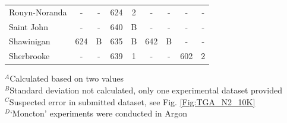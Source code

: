 \documentclass{book}
\begin{document}
\begin{table}[p]
\begin{center}
\begin{tabular}{|l|cc|cc|cc|cc|}
Rouyn-Noranda           & -           & -               & 624            & 2                & -          & -                 & -           & -                     \\
Saint John              & -           & -               & 640            & B                & -          & -                 & -           & -                     \\
Shawinigan              & 624         & B               & 635            & B                & 642        & B                 & -           & -                     \\
Sherbrooke              & -           & -               & 639            & 1                & -          & -                 & 602         & 2                     \\  \hline
\end{tabular}
\end{center}
$^A$Calculated based on two values \\
$^B$Standard deviation not calculated, only one experimental dataset provided \\
$^C$Suspected error in submitted dataset, see Fig. \ref{Fig:TGA_N2_10K}\\
$^D$`Moncton' experiments were conducted in Argon
\end{table}
\end{document}
